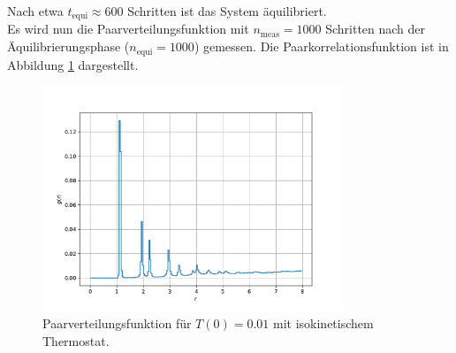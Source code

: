 Nach etwa $t_\text{equi} \approx 600$ Schritten ist das System äquilibriert.
\\
Es wird nun die Paarverteilungsfunktion mit $n_\text{meas}=1000$ Schritten nach der Äquilibrierungsphase ($n_\text{equi}=1000$) gemessen.
Die Paarkorrelationsfunktion ist in Abbildung \ref{fig:g_001_iso} dargestellt.
\begin{figure}
    \centering
    \includegraphics[width=0.8\textwidth]{content/plots/g_d)_T001_thermo.pdf}
    \caption{Paarverteilungsfunktion für $T(0)=0.01$ mit isokinetischem Thermostat.}
    \label{fig:g_001_iso}
\end{figure}

\FloatBarrier
